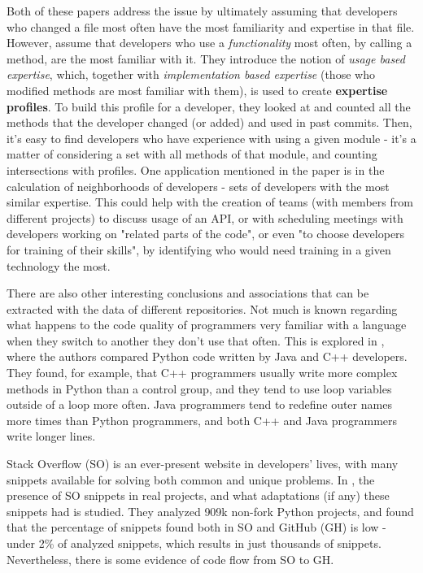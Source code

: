 Both of these papers address the issue by ultimately assuming that developers who changed a file most often have the most familiarity and expertise in that file. However,   \cite{Schuler_2008} assume that developers who use a \textit{functionality} most often, by calling a method, are the most familiar with it. They introduce the notion of \textit{usage based expertise}, which, together with \textit{implementation based expertise} (those who modified methods are most familiar with them), is used to create \textbf{expertise profiles}. To build this profile for a developer, they looked at and counted all the methods that the developer changed (or added) and used in past commits. Then, it's easy to find developers who have experience with using a given module - it's a matter of considering a set with all methods of that module, and counting intersections with profiles. One application mentioned in the paper is in the calculation of neighborhoods of developers - sets of developers with the most similar expertise. This could help with the creation of teams (with members from different projects) to discuss usage of an API, or with scheduling meetings with developers working on "related parts of the code", or even "to choose developers for training of their skills", by identifying who would need training in a given technology the most.

There are also other interesting conclusions and associations that can be extracted with the data of different repositories. Not much is known regarding what happens to the code quality of programmers very familiar with a language when they switch to another they don't use that often. This is explored in \cite{Horschig_2018}, where the authors compared Python code written by Java and C++ developers. They found, for example, that C++ programmers usually write more complex methods in Python than a control group, and they tend to use loop variables outside of a loop more often. Java programmers tend to redefine outer names more times than Python programmers, and both C++ and Java programmers write longer lines.

Stack Overflow (SO) is an ever-present website in developers' lives, with many snippets available for solving both common and unique problems. In \cite{Yang_2017}, the presence of SO snippets in real projects, and what adaptations (if any) these snippets had is studied. They analyzed 909k non-fork Python projects, and found that the percentage of snippets found both in SO and GitHub (GH) is low - under 2\% of analyzed snippets, which results in just thousands of snippets. Nevertheless, there is some evidence of code flow from SO to GH.


